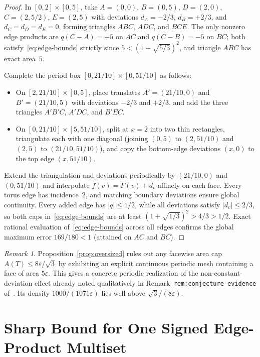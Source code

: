 \documentclass[11pt]{article}
\theoremstyle{plain}
\theoremstyle{definition}
\theoremstyle{remark}
\newtheorem{remark}{Remark}
\begin{document}
\begin{proof}
In $[0,2] \times [0,5]$, take $A = (0,0)$, $B = (0,5)$, $D = (2,0)$, $C = (2,5/2)$, $E = (2,5)$ with deviations $d_A = -2/3$, $d_B = +2/3$, and $d_C = d_D = d_E = 0$, forming triangles $ABC$, $ADC$, and $BCE$.
The only nonzero edge products are $q(C-A) = +5$ on $AC$ and $q(C-B) = -5$ on $BC$; both satisfy~\eqref{eq:edge-bounds} strictly since $5 < (1 + \sqrt{5/3})^2$, and triangle $ABC$ has exact area~$5$.

Complete the period box $[0, 21/10] \times [0, 51/10]$ as follows:
\begin{itemize}[leftmargin=1.6em,itemsep=2pt]
\item On $[2, 21/10] \times [0,5]$, place translates $A' = (21/10, 0)$ and $B' = (21/10, 5)$ with deviations $-2/3$ and $+2/3$, and add the three triangles $A'B'C$, $A'DC$, and $B'EC$.
\item On $[0, 21/10] \times [5, 51/10]$, split at $x = 2$ into two thin rectangles, triangulate each with one diagonal (joining $(0,5)$ to $(2, 51/10)$ and $(2,5)$ to $(21/10, 51/10)$), and copy the bottom-edge deviations $(x,0)$ to the top edge $(x, 51/10)$.
\end{itemize}
Extend the triangulation and deviations periodically by $(21/10, 0)$ and $(0, 51/10)$ and interpolate $f(v) = F(v) + d_v$ affinely on each face.
Every torus edge has incidence~$2$, and matching boundary deviations ensure global continuity.
Every added edge has $|q| \le 1/2$, while all deviations satisfy $|d_v| \le 2/3$, so both caps in~\eqref{eq:edge-bounds} are at least $(1 + \sqrt{1/3})^2 > 4/3 > 1/2$.
Exact rational evaluation of~\eqref{eq:edge-bounds} across all edges confirms the global maximum error $169/180 < 1$ (attained on $AC$ and $BC$).
\end{proof}

\begin{remark}
Proposition~\ref{prop:oversized} rules out any facewise area cap $A(T) \le 8\varepsilon/\sqrt{3}$ by exhibiting an explicit continuous periodic mesh containing a face of area $5\varepsilon$. This gives a concrete periodic realization of the non-constant-deviation effect already noted qualitatively in Remark~\texttt{rem:conjecture-evidence} of~\cite{Burlacu2026}. Its density $1000/(1071\varepsilon)$ lies well above $\sqrt{3}/(8\varepsilon)$.
\end{remark}

\section{Sharp Bound for One Signed Edge-Product Multiset}
\end{document}

